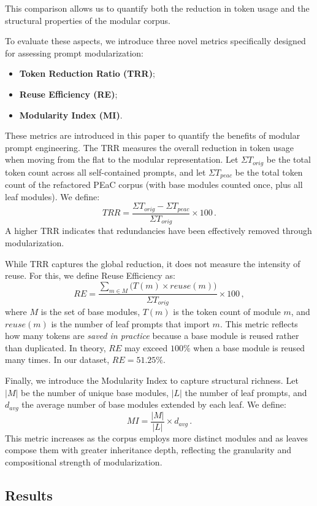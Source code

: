 This comparison allows us to quantify both the reduction in token usage and the structural properties of the modular corpus. 

To evaluate these aspects, we introduce three novel metrics specifically designed for assessing prompt modularization:
\begin{itemize}
        \item \textbf{Token Reduction Ratio (TRR)};
        \item \textbf{Reuse Efficiency (RE)};
        \item \textbf{Modularity Index (MI)}.
\end{itemize}

These metrics are introduced in this paper to quantify the benefits of modular prompt engineering. The TRR measures the overall reduction in token usage when moving from the flat to the modular representation. Let $\Sigma T_{orig}$ be the total token count across all self-contained prompts, and let $\Sigma T_{peac}$ be the total token count of the refactored PEaC corpus (with base modules counted once, plus all leaf modules). We define:
\[
TRR = \frac{\Sigma T_{orig} - \Sigma T_{peac}}{\Sigma T_{orig}} \times 100 \, .
\]
A higher TRR indicates that redundancies have been effectively removed through modularization.

While TRR captures the global reduction, it does not measure the intensity of reuse. For this, we define Reuse Efficiency as:
\[
RE = \frac{\sum_{m \in M} \big( T(m) \times reuse(m) \big)}{\Sigma T_{orig}} \times 100 \, ,
\]
where $M$ is the set of base modules, $T(m)$ is the token count of module $m$, and $reuse(m)$ is the number of leaf prompts that import $m$. This metric reflects how many tokens are \emph{saved in practice} because a base module is reused rather than duplicated. In theory, $RE$ may exceed $100\%$ when a base module is reused many times. In our dataset, $RE = 51.25\%$.

Finally, we introduce the Modularity Index to capture structural richness.  
Let $|M|$ be the number of unique base modules, $|L|$ the number of leaf prompts, and $d_{avg}$ the average number of base modules extended by each leaf.  
We define:
\[
MI = \frac{|M|}{|L|} \times d_{avg} \, .
\]
This metric increases as the corpus employs more distinct modules and as leaves compose them with greater inheritance depth, reflecting the granularity and compositional strength of modularization.


\subsection{Results}

